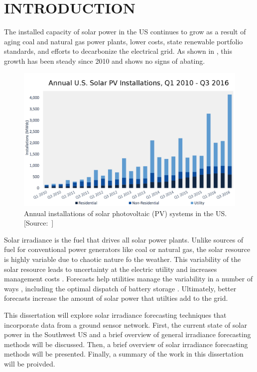 \chapter{INTRODUCTION}
\label{chap:intro}

The installed capacity of solar power in the US continues to grow as a
result of aging coal and natural gas power plants, lower costs,
state renewable portfolio standards, and efforts to decarbonize the
electrical grid.
As shown in , this growth has been steady since
2010 and shows no signs of abating.

\begin{figure}[htb]
  \includegraphics[width=\textwidth]{figs/solar_installations.png}
  \caption[Annual installations of solar PV in the US]{Annual
    installations of solar photovoltaic (PV) systems in the
    US. [Source:~\cite{GTM/SEIA2016}]}
\label{fig:solarinstall}
\end{figure}

Solar irradiance is the fuel that drives all solar power plants.
Unlike sources of fuel for conventional power generators like coal or
natural gas, the solar resource is highly variable due to chaotic
nature fo the weather.
This variability of the solar resource leads to uncertainty at the
electric utility and increases management costs \citep{Joskow2011}.
Forecasts help utilities manage the variability in a number of ways
\citep{Kleissl2013,Inman2013}, including the optimal dispatch of
battery storage \citep{Cormode2015}.
Ultimately, better forecasts increase the amount of solar power that
utilties add to the grid.

This dissertation will explore solar irradiance forecasting techniques
that incorporate data from a ground sensor network.
First, the current state of solar power in the Southwest US and a
brief overview of general irradiance forecasting methods will be
discussed. Then, a brief overview of solar irradiance forecasting
methods will be presented. Finally, a summary of the work in this
dissertation will be proivded.

